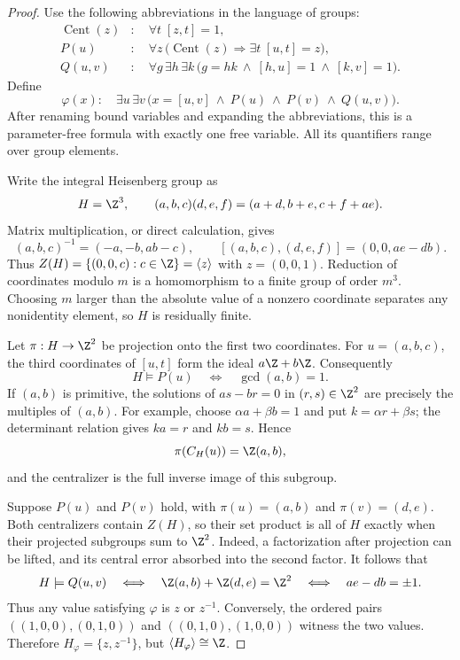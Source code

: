 \begin{proof}
Use the following abbreviations in the language of groups:
\begin{align*}
\operatorname{Cent}(z)&:\quad \forall t\;[z,t]=1,\\
P(u)&:\quad \forall z\,
 \bigl(\operatorname{Cent}(z)\Longrightarrow
                  \exists t\;[u,t]=z\bigr),\\
Q(u,v)&:\quad \forall g\,\exists h\,\exists k\,
 \bigl(g=hk\ \wedge\ [h,u]=1\ \wedge\ [k,v]=1\bigr).
\end{align*}
Define
\[
\varphi(x):\quad \exists u\,\exists v\,
 \bigl(x=[u,v]\ \wedge\ P(u)\ \wedge\ P(v)\ \wedge\ Q(u,v)\bigr).
\]
After renaming bound variables and expanding the abbreviations,
this is a parameter-free formula with exactly one free variable.
All its quantifiers range over group elements.

Write the integral Heisenberg group as
\[
H=\Z^3,\qquad
(a,b,c)(d,e,f)=(a+d,b+e,c+f+ae).
\]
Matrix multiplication, or direct calculation, gives
\[
(a,b,c)^{-1}=(-a,-b,ab-c),\qquad
[(a,b,c),(d,e,f)]=(0,0,ae-db).
\]
Thus $Z(H)=\{(0,0,c):c\in\Z\}=\langle z\rangle$ with
$z=(0,0,1)$. Reduction of coordinates modulo $m$ is a homomorphism
to a finite group of order $m^3$. Choosing $m$ larger than the
absolute value of a nonzero coordinate separates any nonidentity
element, so $H$ is residually finite.

Let $\pi:H\to\Z^2$ be projection onto the first two coordinates.
For $u=(a,b,c)$, the third coordinates of $[u,t]$ form the ideal
$a\Z+b\Z$. Consequently
\[
H\models P(u)\quad\Longleftrightarrow\quad \gcd(a,b)=1.
\]
If $(a,b)$ is primitive, the solutions of $as-br=0$ in
$(r,s)\in\Z^2$ are precisely the multiples of $(a,b)$.
For example, choose $\alpha a+\beta b=1$ and put
$k=\alpha r+\beta s$; the determinant relation gives
$ka=r$ and $kb=s$. Hence
\[
\pi(C_H(u))=\Z(a,b),
\]
and the centralizer is the full inverse image of this subgroup.

Suppose $P(u)$ and $P(v)$ hold, with
$\pi(u)=(a,b)$ and $\pi(v)=(d,e)$.
Both centralizers contain $Z(H)$, so their set product is all of
$H$ exactly when their projected subgroups sum to $\Z^2$.
Indeed, a factorization after projection can be lifted, and its
central error absorbed into the second factor. It follows that
\[
H\models Q(u,v)
\quad\Longleftrightarrow\quad
\Z(a,b)+\Z(d,e)=\Z^2
\quad\Longleftrightarrow\quad ae-db=\pm1.
\]
Thus any value satisfying $\varphi$ is $z$ or $z^{-1}$.
Conversely, the ordered pairs
$((1,0,0),(0,1,0))$ and $((0,1,0),(1,0,0))$
witness the two values. Therefore
$H_\varphi=\{z,z^{-1}\}$, but
$\langle H_\varphi\rangle\cong\Z$.
\end{proof}

